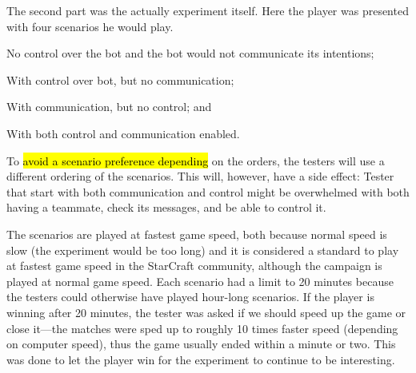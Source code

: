 The second part was the actually experiment itself. Here the player was presented with four scenarios he would play.
\begin{inparaenum}[1\upshape)]
	\item No control over the bot and the bot would not communicate its intentions;
	\item With control over bot, but no communication;
	\item With communication, but no control; and
	\item With both control and communication enabled.
\end{inparaenum}
To \hl{avoid a scenario preference depending} on the orders, the testers will use a different ordering of the scenarios. This will, however, have a side effect: Tester that start with both communication and control might be overwhelmed with both having a teammate, check its messages, and be able to control it.

The scenarios are played at fastest game speed, both because normal speed is slow (the experiment would be too long) and it is considered a standard to play at fastest game speed in the StarCraft community, although the campaign is played at normal game speed. Each scenario had a limit to 20 minutes because the testers could otherwise have played hour-long scenarios. If the player is winning after 20 minutes, the tester was asked if we should speed up the game or close it—the matches were sped up to roughly 10 times faster speed (depending on computer speed), thus the game usually ended within a minute or two. This was done to let the player win for the experiment to continue to be interesting.
